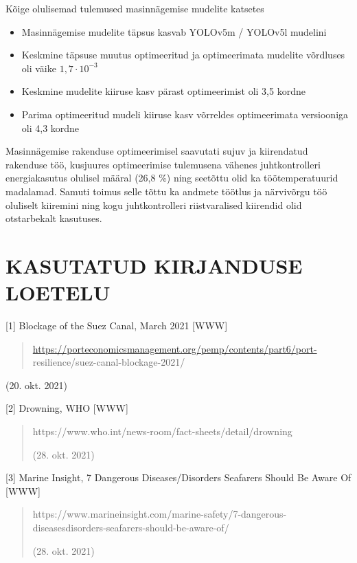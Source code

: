 \documentclass[12pt,a4paper]{report}
\begin{document}
Kõige olulisemad tulemused masinnägemise mudelite katsetes

\begin{itemize}
\item
  Masinnägemise mudelite täpsus kasvab YOLOv5m / YOLOv5l mudelini
\item
  Keskmine täpsuse muutus optimeeritud ja optimeerimata mudelite võrdluses oli väike \({1,7 \cdot 10}^{- 3}\)
\item
  Keskmine mudelite kiiruse kasv pärast optimeerimist oli 3,5 kordne
\item
  Parima optimeeritud mudeli kiiruse kasv võrreldes optimeerimata versiooniga oli 4,3 kordne
\end{itemize}

Masinnägemise rakenduse optimeerimisel saavutati sujuv ja kiirendatud rakenduse töö, kusjuures optimeerimise tulemusena vähenes juhtkontrolleri energiakasutus olulisel määral (26,8 \%) ning seetõttu olid ka töötemperatuurid madalamad. Samuti toimus selle tõttu ka andmete töötlus ja närvivõrgu töö oluliselt kiiremini ning kogu juhtkontrolleri riistvaralised kiirendid olid otstarbekalt kasutuses.

\section*{KASUTATUD KIRJANDUSE LOETELU}\label{kasutatud-kirjanduse-loetelu}

{[}1{]} Blockage of the Suez Canal, March 2021 {[}WWW{]}

\begin{quote}
\url{https://porteconomicsmanagement.org/pemp/contents/part6/port-}resilience/suez-canal-blockage-2021/
\end{quote}

(20. okt. 2021)

{[}2{]} Drowning, WHO {[}WWW{]}

\begin{quote}
https://www.who.int/news-room/fact-sheets/detail/drowning

(28. okt. 2021)
\end{quote}

{[}3{]} Marine Insight, 7 Dangerous Diseases/Disorders Seafarers Should Be Aware Of {[}WWW{]}

\begin{quote}
https://www.marineinsight.com/marine-safety/7-dangerous-diseasesdisorders-seafarers-should-be-aware-of/

(28. okt. 2021)
\end{quote}
\end{document}
